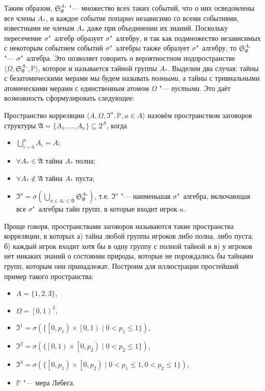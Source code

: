 Таким образом, $\mathfrak{S}_\Phi^{A_*}$ "--- множество всех таких событий, что о них осведомлены все члены $A_*$, и каждое событие попарно независимо со всеми событиями, известными не членам $A_*$ даже при объединении их знаний. Поскольку пересечение $\sigma$"~алгебр образует $\sigma$"~алгебру, и так как подмножество независимых с некоторым событием событий $\sigma$"~алгебры также образует $\sigma$"~алгебру, то $\mathfrak{S}_\Phi^{A_*}$ "--- $\sigma$"~алгебра. Это позволяет говорить о вероятностном подпространстве $\langle \Omega, \mathfrak{S}_\Phi^{A_*}, \mathbb{P} \rangle$, которое и называется тайной группы $A_*$. Выделим два случая: тайны с безатомическими мерами мы будем называть \emph{полными}, а тайны с тривиальными атомическими мерами с единственным атомом $\Omega$ "--- \emph{пустыми}. Это даёт возможность сформулировать следующее:
\begin{definition}
	Пространство корреляции $\langle A, \Omega, \mathfrak{I}^a, \mathbb{P}, a \in A \rangle$ назовём пространством заговоров структуры $\mathfrak{A} = \{A_1, ..., A_n\} \subseteq 2^A$, когда
	\begin{itemize}
		\item $\bigcup\limits_{i=0}^n A_i = A$;
		\item $\forall A_* \in \mathfrak{A}$ тайна $A_*$ полна;
		\item $\forall A_* \notin \mathfrak{A}$ тайна $A_*$ пуста;
		\item $\mathfrak{I}^a = \sigma(\bigcup\limits_{a \in A_* \in \mathfrak{A}}\mathfrak{S}_\Phi^{A_*})$, т.е. $\mathfrak{I}^a$ "--- наименьшая $\sigma$"~алгебра, включающая все $\sigma$"~алгебры тайн групп, в которые входит игрок $a$.
	\end{itemize}
\end{definition}

Проще говоря, пространствами заговоров называются такие пространства корреляции, в которых а) тайна любой группы игроков либо полна, либо пуста; б) каждый игрок входит хотя бы в одну группу с полной тайной и в) у игроков нет никаких знаний о состоянии природы, которые не порождались бы тайнами групп, которым они принадлежат. Построим для иллюстрации простейший пример такого пространства:
\begin{itemize}
	\item $A = \{1, 2, 3\}$,
	\item $\Omega = \left[0, 1\right)^2$,
	\item $\mathfrak{I}^1 = \sigma(\{\left[ 0, p_1 \right) \times \left[ 0, 1 \right) \mid 0 < p_1 \leq 1 \})$,
	\item $\mathfrak{I}^2 = \sigma(\{\left[ 0, 1 \right) \times \left[ 0, p_2 \right) \mid 0 < p_2 \leq 1 \})$,
	\item $\mathfrak{I}^3 = \sigma(\{\left[ 0, p_1 \right) \times \left[ 0, p_2 \right) \mid 0 < p_1 \leq 1, 0 < p_2 \leq 1 \})$,
	\item $\mathbb{P}$ "--- мера Лебега.
\end{itemize}

